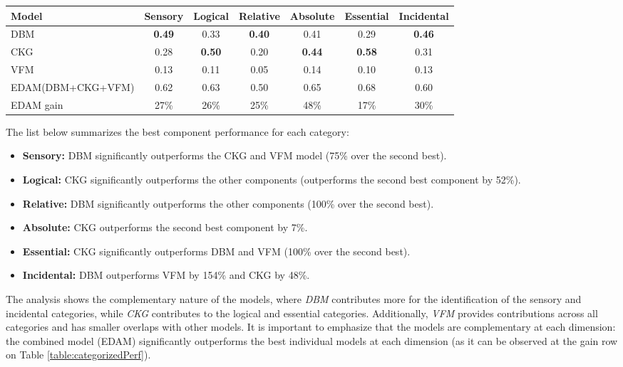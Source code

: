 \documentclass[11pt,a4paper]{article}
\begin{document}
\begin{table*}[!htb]
    \centering
        \begin{tabularx}{\textwidth}{ |X|c|c|c|c|c|c| }
            \hline
            \textbf{Model} & \textbf{Sensory} & \textbf{Logical} & \textbf{Relative} & \textbf{Absolute} & \textbf{Essential} & \textbf{Incidental} \\
            \hline
            DBM & \textbf{0.49} & 0.33 & \textbf{0.40} & 0.41 & 0.29 & \textbf{0.46} \\
            CKG & 0.28 & \textbf{0.50} & 0.20 & \textbf{0.44} & \textbf{0.58} & 0.31 \\
            VFM & 0.13 & 0.11 & 0.05 & 0.14 & 0.10 & 0.13 \\
            EDAM(DBM+CKG+VFM) & 0.62 & 0.63 & 0.50 & 0.65 & 0.68 & 0.60 \\
			\hhline{|=|=|=|=|=|=|=|}
            EDAM gain     & 27\% & 26\% & 25\% & 48\% & 17\% & 30\% \\
            \hline
            \end{tabularx}
    \caption{Performance comparison (recall) against a random sample of categorized triples. The last row shows the relative gain of the combined model over the best performing individual model.}
    \label{table:categorizedPerf}
\end{table*}

The list below summarizes the best component performance for each category:

\begin{itemize}
\item \textbf{Sensory:} DBM significantly outperforms the CKG and VFM model (75\% over the second best). 
\item \textbf{Logical:} CKG significantly outperforms the other components (outperforms the second best component by 52\%). 
\item \textbf{Relative:} DBM significantly outperforms the other components (100\% over the second best).
\item \textbf{Absolute:} CKG outperforms the second best component by 7\%.   
\item \textbf{Essential:} CKG significantly outperforms DBM and VFM (100\% over the second best).
\item \textbf{Incidental:} DBM outperforms VFM by 154\% and CKG by 48\%.
\end{itemize}

The analysis shows the complementary nature of the models, where \textit{DBM} contributes more for the identification of the sensory and incidental categories, while \textit{CKG} contributes to the logical and essential categories. Additionally, \textit{VFM} provides contributions across all categories and has smaller overlaps with other models. It is important to emphasize that the models are complementary at each dimension: the combined model (EDAM) significantly outperforms the best individual models at each dimension (as it can be observed at the gain row on Table \ref{table:categorizedPerf}).
\end{document}
